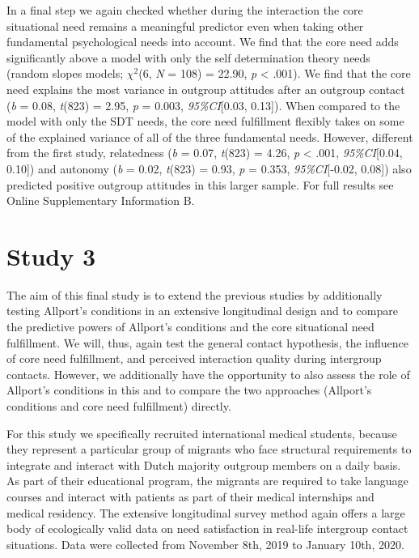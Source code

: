 In a final step we again checked whether during the interaction the core
situational need remains a meaningful predictor even when taking other
fundamental psychological needs into account. We find that the core need
adds significantly above a model with only the self determination theory
needs (random slopes models; \(\chi^2\)(6, \textit{N} = 108) = 22.90,
\textit{p} \textless{} .001). We find that the core need explains the
most variance in outgroup attitudes after an outgroup contact
(\textit{b} = 0.08, \textit{t}(823) = 2.95, \textit{p} = 0.003,
\textit{95\%CI}{[}0.03, 0.13{]}). When compared to the model with only
the SDT needs, the core need fulfillment flexibly takes on some of the
explained variance of all of the three fundamental needs. However,
different from the first study, relatedness (\textit{b} = 0.07,
\textit{t}(823) = 4.26, \textit{p} \textless{} .001,
\textit{95\%CI}{[}0.04, 0.10{]}) and autonomy (\textit{b} = 0.02,
\textit{t}(823) = 0.93, \textit{p} = 0.353, \textit{95\%CI}{[}-0.02,
0.08{]}) also predicted positive outgroup attitudes in this larger
sample. For full results see Online Supplementary Information B.

\section{Study 3}

The aim of this final study is to extend the previous studies by
additionally testing Allport's conditions in an extensive longitudinal
design and to compare the predictive powers of Allport's conditions and
the core situational need fulfillment. We will, thus, again test the
general contact hypothesis, the influence of core need fulfillment, and
perceived interaction quality during intergroup contacts. However, we
additionally have the opportunity to also assess the role of Allport's
conditions in this and to compare the two approaches (Allport's
conditions and core need fulfillment) directly.

For this study we specifically recruited international medical students,
because they represent a particular group of migrants who face
structural requirements to integrate and interact with Dutch majority
outgroup members on a daily basis. As part of their educational program,
the migrants are required to take language courses and interact with
patients as part of their medical internships and medical residency. The
extensive longitudinal survey method again offers a large body of
ecologically valid data on need satisfaction in real-life intergroup
contact situations. Data were collected from November 8th, 2019 to
January 10th, 2020.

